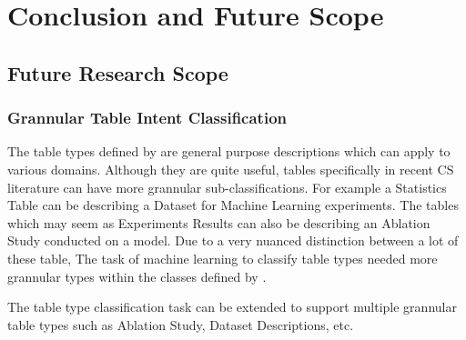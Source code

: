 \chapter{Conclusion and Future Scope}
\label{conclusion}

\section{Future Research Scope}
\label{conclusion:future-scope}
\subsection{Grannular Table Intent Classification}
\label{conclusion:future-scope:type-class}

The table types defined by \cite{kim2012scientific} are general purpose descriptions which can apply to various domains. Although they are quite useful, tables specifically in recent CS literature can have more grannular sub-classifications. For example a Statistics Table can be describing a Dataset for Machine Learning experiments. The tables which may seem as Experiments Results can also be describing an Ablation Study conducted on a model. Due to a very nuanced distinction between a lot of these table, The task of machine learning to classify table types needed more grannular types within the classes defined by \cite{kim2012scientific}.

The table type classification task can be extended to support multiple grannular table types such as Ablation Study, Dataset Descriptions, etc. 